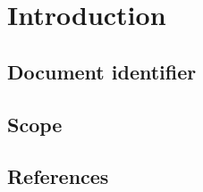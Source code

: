 \chapter{Introduction} \label{chp:introduction}
	\begin{comment}
		Introduce the following subordinate sections. This section identifies the issuing organization and the
		details of issuance. It includes required approvals and status (DRAFT/FINAL) of the document. It is
		here that the scope is described and references identified.
	\end{comment}

\section{Document identifier} \label{s:introduction:document-identifier}
	\begin{comment}
		Uniquely identify a version of the document by including information such as the date of issue, the
		issuing organization, the author(s), the approval signatures (possibly electronic), and the status/version
		(e.g., draft, reviewed, corrected, or final). Identifying information may also include the reviewers and
		pertinent managers. This information is commonly put on an early page in the document, such as the
		cover page or the pages immediately following it. Some organizations put this information at the end
		of the document. This information may also be kept in a place other than in the text of the document
		(e.g., in the configuration management system or in the header or footer of the document).
	\end{comment}
\section{Scope} \label{s:introduction:scope}
	\begin{comment}
		Identify the test items (software or system) that are the object of testing, e.g., specific attributes of the
		software, the installation instructions, the user instructions, interfacing hardware, database conversion
		software that is not a part of the operational system) including their version/revision level. Also
		identify any procedures for their transfer from other environments to the test environment.
		Supply references to the test item documentation relevant to an individual level of test, if it exists, such
		as follows:
		⎯ Requirements
		⎯ Design
		⎯ User’s guide
		⎯ Operations guide
		⎯ Installation guide
		Reference any Anomaly Reports relating to the test items.
		Identify any items that are to be specifically excluded from testing.
	\end{comment}
\section{References} \label{s:introduction:references}
	\begin{comment}
		List all of the applicable reference documents. The references are separated into “external” references
		that are imposed external to the project and “internal” references that are imposed from within to the
		project. This may also be at the end of the document.
	\end{comment}
